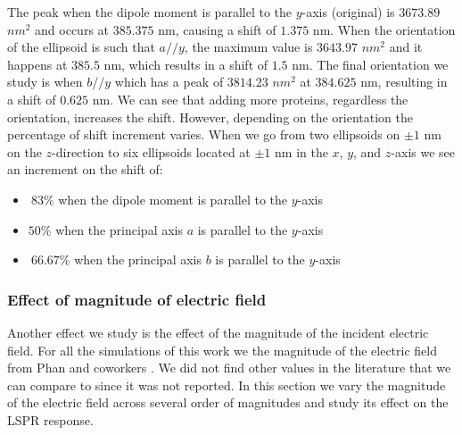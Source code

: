  The peak when the dipole 
 moment is parallel to the $y$-axis (original) is $3673.89$ $nm^2$ and occurs at $385.375$ nm, causing a shift of 
 $1.375$ nm. When the orientation of the ellipsoid is such that $a//y$, the maximum value is $3643.97$ $nm^2$ and it
 happens at $385.5$ nm, which results in a shift of $1.5$ nm. The final orientation we study is when $b//y$ which 
 has a peak of $3814.23$ $nm^2$ at $384.625$ nm, resulting in a shift of $0.625$ nm. We can see that adding more proteins, 
 regardless the orientation, increases the shift. However, depending on the orientation the percentage of shift increment 
 varies. When we go from two ellipsoids on $\pm 1$ nm on the $z$-direction to six ellipsoids located at 
 $\pm 1$ nm in the $x$, $y$, and $z$-axis we see an increment on the shift of:
 
 \begin{itemize}
     \item {$~83\%$ when the dipole moment is parallel to the $y$-axis}
     \item {$50\%$ when the principal axis $a$ is parallel to the $y$-axis}
     \item {$~66.67\%$ when the principal axis $b$ is parallel to the $y$-axis}
 \end{itemize}    
 
\subsubsection{Effect of magnitude of electric field}

Another effect we study is the effect of the magnitude of the incident electric field. For 
all the simulations of this work we the magnitude of the electric field from Phan and 
coworkers \cite{PhanETal2013}. We did not find other values in the literature that we can compare to since
it was not reported. In this section we vary the magnitude of the electric field across several order of magnitudes 
and study its effect on the LSPR response. 

